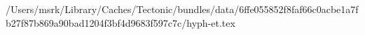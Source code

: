 /Users/msrk/Library/Caches/Tectonic/bundles/data/6ffe055852f8faf66c0acbe1a7fb27f87b869a90bad1204f3bf4d9683f597c7c/hyph-et.tex